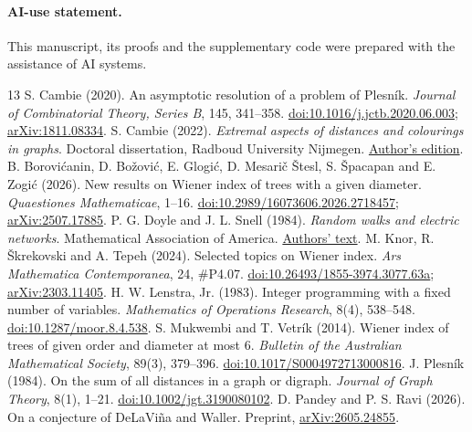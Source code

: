 \documentclass[11pt,a4paper]{article}
\theoremstyle{remark}
\begin{document}
\paragraph{AI-use statement.} This manuscript, its proofs and the supplementary code were prepared with the assistance of AI systems.

\begin{thebibliography}{13}\small
{} S. Cambie (2020). An asymptotic resolution of a problem of Plesník. \emph{Journal of Combinatorial Theory, Series B}, 145, 341--358. \href{https://doi.org/10.1016/j.jctb.2020.06.003}{doi:10.1016/j.jctb.2020.06.003}; \href{https://arxiv.org/abs/1811.08334}{arXiv:1811.08334}.
 S. Cambie (2022). \emph{Extremal aspects of distances and colourings in graphs}. Doctoral dissertation, Radboud University Nijmegen. \href{https://www.math.ru.nl/personal/stijncambie/PhDthesis_StijnCambie_B5_short_volledig.pdf}{Author's edition}.
 B. Borovićanin, D. Božović, E. Glogić, D. Mesarič Štesl, S. Špacapan and E. Zogić (2026). New results on Wiener index of trees with a given diameter. \emph{Quaestiones Mathematicae}, 1--16. \href{https://doi.org/10.2989/16073606.2026.2718457}{doi:10.2989/16073606.2026.2718457}; \href{https://arxiv.org/abs/2507.17885}{arXiv:2507.17885}.
 P. G. Doyle and J. L. Snell (1984). \emph{Random walks and electric networks}. Mathematical Association of America. \href{https://math.dartmouth.edu/~doyle/docs/walks/walks.pdf}{Authors' text}.
 M. Knor, R. Škrekovski and A. Tepeh (2024). Selected topics on Wiener index. \emph{Ars Mathematica Contemporanea}, 24, \#P4.07. \href{https://doi.org/10.26493/1855-3974.3077.63a}{doi:10.26493/1855-3974.3077.63a}; \href{https://arxiv.org/abs/2303.11405}{arXiv:2303.11405}.
 H. W. Lenstra, Jr. (1983). Integer programming with a fixed number of variables. \emph{Mathematics of Operations Research}, 8(4), 538--548. \href{https://doi.org/10.1287/moor.8.4.538}{doi:10.1287/moor.8.4.538}.
 S. Mukwembi and T. Vetrík (2014). Wiener index of trees of given order and diameter at most 6. \emph{Bulletin of the Australian Mathematical Society}, 89(3), 379--396. \href{https://doi.org/10.1017/S0004972713000816}{doi:10.1017/S0004972713000816}.
 J. Plesník (1984). On the sum of all distances in a graph or digraph. \emph{Journal of Graph Theory}, 8(1), 1--21. \href{https://doi.org/10.1002/jgt.3190080102}{doi:10.1002/jgt.3190080102}.
 D. Pandey and P. S. Ravi (2026). On a conjecture of DeLaViña and Waller. Preprint, \href{https://arxiv.org/abs/2605.24855}{arXiv:2605.24855}.

\end{thebibliography}
\end{document}
